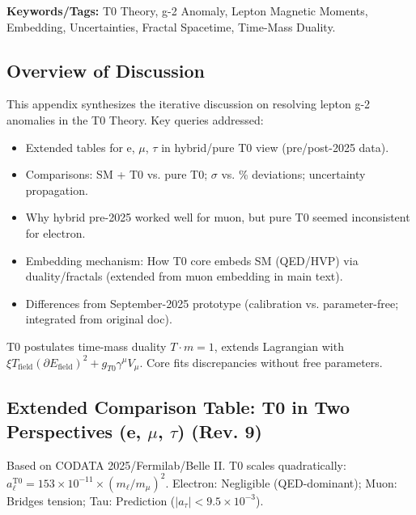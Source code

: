 \documentclass[12pt,a4paper]{article}
\theoremstyle{definition}
\begin{document}
	\textbf{Keywords/Tags:} T0 Theory, g-2 Anomaly, Lepton Magnetic Moments, Embedding, Uncertainties, Fractal Spacetime, Time-Mass Duality.
	
	\subsection{Overview of Discussion}
	
	This appendix synthesizes the iterative discussion on resolving lepton g-2 anomalies in the T0 Theory. Key queries addressed:
	\begin{itemize}
		\item Extended tables for e, $\mu$, $\tau$ in hybrid/pure T0 view (pre/post-2025 data).
		\item Comparisons: SM + T0 vs. pure T0; $\sigma$ vs. \% deviations; uncertainty propagation.
		\item Why hybrid pre-2025 worked well for muon, but pure T0 seemed inconsistent for electron.
		\item Embedding mechanism: How T0 core embeds SM (QED/HVP) via duality/fractals (extended from muon embedding in main text).
		\item Differences from September-2025 prototype (calibration vs. parameter-free; integrated from original doc).
	\end{itemize}
	
	T0 postulates time-mass duality $T \cdot m = 1$, extends Lagrangian with $\xi T_\text{field} (\partial E_\text{field})^2 + g_{T0} \gamma^\mu V_\mu$. Core fits discrepancies without free parameters.
	
	\subsection{Extended Comparison Table: T0 in Two Perspectives (e, $\mu$, $\tau$) (Rev. 9)}
	
	Based on CODATA 2025/Fermilab/Belle II. T0 scales quadratically: $a_\ell^\text{T0} = 153 \times 10^{-11} \times (m_\ell / m_\mu)^2$. Electron: Negligible (QED-dominant); Muon: Bridges tension; Tau: Prediction ($|a_\tau| < 9.5 \times 10^{-3}$).
	
\end{document}
